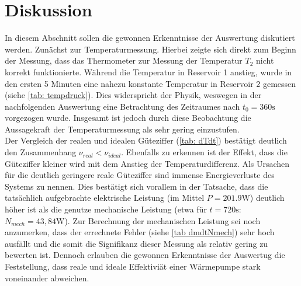 \section{Diskussion}
In diesem Abschnitt sollen die gewonnen Erkenntnisse der Auswertung diskutiert werden. Zunächst zur Temperaturmessung.
Hierbei zeigte sich direkt zum Beginn der Messung, dass das Thermometer zur Messung der Temperatur $T_2$ nicht korrekt
funktionierte. Während die Temperatur in Reservoir 1 anstieg, wurde in den ersten 5 Minuten eine nahezu konstante Temperatur
in Reservoir 2 gemessen (siehe \ref{tab: tempdruck}). Dies widerspricht der Physik, weswegen in der nachfolgenden Auswertung
eine Betrachtung des Zeitraumes nach $t_0 = 360\si{\second}$ vorgezogen wurde. Insgesamt ist jedoch durch diese Beobachtung
die Aussagekraft der Temperaturmessung als sehr gering einzustufen. \\
Der Vergleich der realen und idealen Güteziffer (\ref{tab: dTdt}) bestätigt deutlich den Zusammenhang $\nu_{real} < \nu_{ideal}$. Ebenfalls
zu erkennen ist der Effekt, dass die Güteziffer kleiner wird mit dem Anstieg der Temperaturdifferenz. Als Ursachen für die deutlich
geringere reale Güteziffer sind immense Energieverluste des Systems zu nennen. Dies bestätigt sich vorallem in der Tatsache, dass die tatsächlich
aufgebrachte elektrische Leistung (im Mittel $P = 201.9 \si{\watt}$) deutlich höher ist als die genutze mechanische Leistung (etwa
für $t = 720 \si{\second}$: $N_{mech} = 43,84 \si{\watt}$). Zur Berechnung der mechanischen Leistung sei noch anzumerken, dass der errechnete
Fehler (siehe \ref{tab dmdtNmech}) sehr hoch ausfällt und die somit die Signifikanz dieser Messung als relativ gering zu bewerten ist. Dennoch %
erlauben die gewonnen Erkenntnisse der Auswertug die Feststellung, dass reale und ideale Effektiviät einer Wärmepumpe stark voneinander abweichen.
